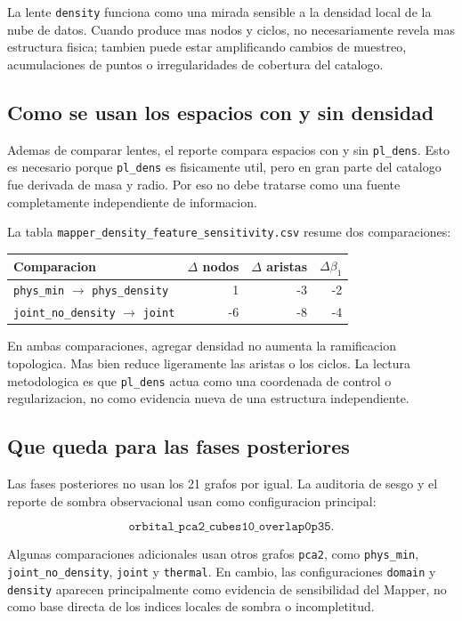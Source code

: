 La lente \texttt{density} funciona como una mirada sensible a la densidad local de la nube de datos. Cuando produce mas nodos y ciclos, no necesariamente revela mas estructura fisica; tambien puede estar amplificando cambios de muestreo, acumulaciones de puntos o irregularidades de cobertura del catalogo.

\subsection*{Como se usan los espacios con y sin densidad}

Ademas de comparar lentes, el reporte compara espacios con y sin \texttt{pl\_dens}. Esto es necesario porque \texttt{pl\_dens} es fisicamente util, pero en gran parte del catalogo fue derivada de masa y radio. Por eso no debe tratarse como una fuente completamente independiente de informacion.

La tabla \texttt{mapper\_density\_feature\_sensitivity.csv} resume dos comparaciones:

\begin{center}
\begin{tabular}{lrrr}
\toprule
\textbf{Comparacion} & $\Delta$ nodos & $\Delta$ aristas & $\Delta \beta_1$ \\
\midrule
\texttt{phys\_min} $\rightarrow$ \texttt{phys\_density} & 1 & -3 & -2 \\
\texttt{joint\_no\_density} $\rightarrow$ \texttt{joint} & -6 & -8 & -4 \\
\bottomrule
\end{tabular}
\end{center}

En ambas comparaciones, agregar densidad no aumenta la ramificacion topologica. Mas bien reduce ligeramente las aristas o los ciclos. La lectura metodologica es que \texttt{pl\_dens} actua como una coordenada de control o regularizacion, no como evidencia nueva de una estructura independiente.

\subsection*{Que queda para las fases posteriores}

Las fases posteriores no usan los 21 grafos por igual. La auditoria de sesgo y el reporte de sombra observacional usan como configuracion principal:

\[
\texttt{orbital\_pca2\_cubes10\_overlap0p35}.
\]

Algunas comparaciones adicionales usan otros grafos \texttt{pca2}, como \texttt{phys\_min}, \texttt{joint\_no\_density}, \texttt{joint} y \texttt{thermal}. En cambio, las configuraciones \texttt{domain} y \texttt{density} aparecen principalmente como evidencia de sensibilidad del Mapper, no como base directa de los indices locales de sombra o incompletitud.

